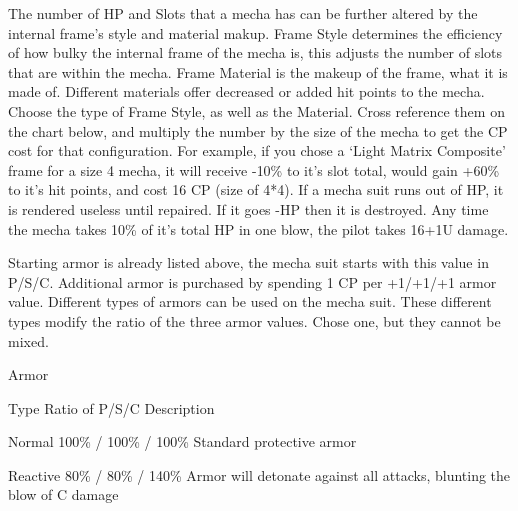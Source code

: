 \documentclass[twoside]{book}
\begin{document}
                    The number of HP and Slots that a mecha has can
                   be further altered by the internal frame's style
                   and material makup. Frame Style determines the
                   efficiency of how bulky the internal frame of the
                   mecha is, this adjusts the number of slots that are
                   within the mecha. Frame Material is the makeup of the
                   frame, what it is made of. Different materials offer
                   decreased or added hit points to the mecha. Choose the
                   type of Frame Style, as well as the Material. Cross
                   reference them on the chart below, and multiply the
                   number by the size of the mecha to get the CP cost for
                   that configuration. 
                    For example, if you chose a `Light Matrix
                   Composite' frame for a size 4 mecha, it will
                   receive -10\% to it's slot total, would gain +60\%
                   to it's hit points, and cost 16 CP (size of
                   4*4). 
                    If a mecha suit runs out of HP, it is rendered
                   useless until repaired. If it goes -HP then it is
                   destroyed. Any time the mecha takes 10\% of it's
                   total HP in one blow, the pilot takes 16+1U damage.
                   
                
                  Starting armor is already listed above, the mecha
                 suit starts with this value in P/S/C. Additional armor
                 is purchased by spending 1 CP per +1/+1/+1 armor value.
                 Different types of armors can be used on the mecha suit.
                 These different types modify the ratio of the three
                 armor values. Chose one, but they cannot be mixed.
                 
                
                Armor  
                  
                    
                      
                       Type   
                       Ratio of P/S/C   
                       Description   
                      
                      
                       Normal   
                       100\% / 100\% / 100\%   
                       Standard protective armor   
                      
                      
                       Reactive   
                       80\% / 80\% / 140\%   
                         Armor will detonate against all attacks,
                         blunting the blow of C damage 
                      
\end{document}
